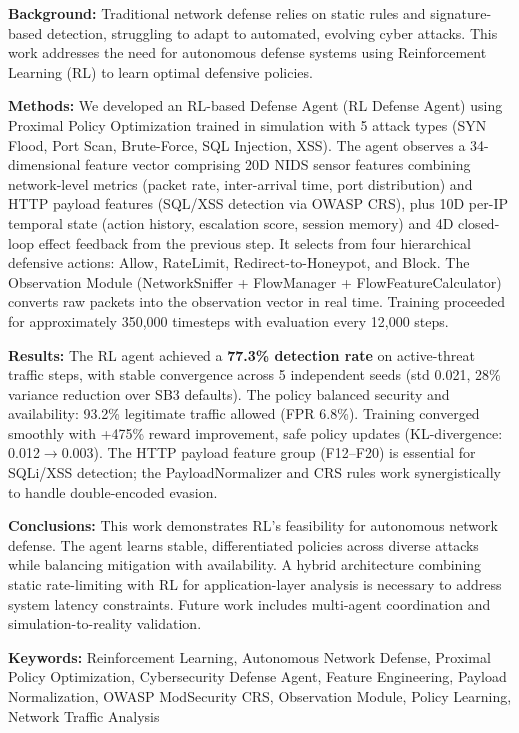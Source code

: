 \documentclass[12pt,a4paper]{report}
\begin{document}
\bigskip
\noindent\textbf{Background:} Traditional network defense relies on static rules and signature-based detection, struggling to adapt to automated, evolving cyber attacks. This work addresses the need for autonomous defense systems using Reinforcement Learning (RL) to learn optimal defensive policies.

\medskip
\noindent\textbf{Methods:} We developed an RL-based Defense Agent (RL Defense Agent) using Proximal Policy Optimization trained in simulation with 5 attack types (SYN Flood, Port Scan, Brute-Force, SQL Injection, XSS). The agent observes a 34-dimensional feature vector comprising 20D NIDS sensor features combining network-level metrics (packet rate, inter-arrival time, port distribution) and HTTP payload features (SQL/XSS detection via OWASP CRS), plus 10D per-IP temporal state (action history, escalation score, session memory) and 4D closed-loop effect feedback from the previous step. It selects from four hierarchical defensive actions: Allow, RateLimit, Redirect-to-Honeypot, and Block. The Observation Module (NetworkSniffer + FlowManager + FlowFeatureCalculator) converts raw packets into the observation vector in real time. Training proceeded for approximately 350{,}000 timesteps with evaluation every 12{,}000 steps.

\medskip
\noindent\textbf{Results:} The RL agent achieved a \textbf{77.3\% detection rate} on active-threat traffic steps, with stable convergence across 5 independent seeds (std 0.021, 28\% variance reduction over SB3 defaults). The policy balanced security and availability: 93.2\% legitimate traffic allowed (FPR 6.8\%). Training converged smoothly with +475\% reward improvement, safe policy updates (KL-divergence: 0.012$\to$0.003). The HTTP payload feature group (F12--F20) is essential for SQLi/XSS detection; the PayloadNormalizer and CRS rules work synergistically to handle double-encoded evasion.

\medskip
\noindent\textbf{Conclusions:} This work demonstrates RL's feasibility for autonomous network defense. The agent learns stable, differentiated policies across diverse attacks while balancing mitigation with availability. A hybrid architecture combining static rate-limiting with RL for application-layer analysis is necessary to address system latency constraints. Future work includes multi-agent coordination and simulation-to-reality validation.

\medskip
\noindent\textbf{Keywords:} Reinforcement Learning, Autonomous Network Defense, Proximal Policy Optimization, Cybersecurity Defense Agent, Feature Engineering, Payload Normalization, OWASP ModSecurity CRS, Observation Module, Policy Learning, Network Traffic Analysis
\end{document}

